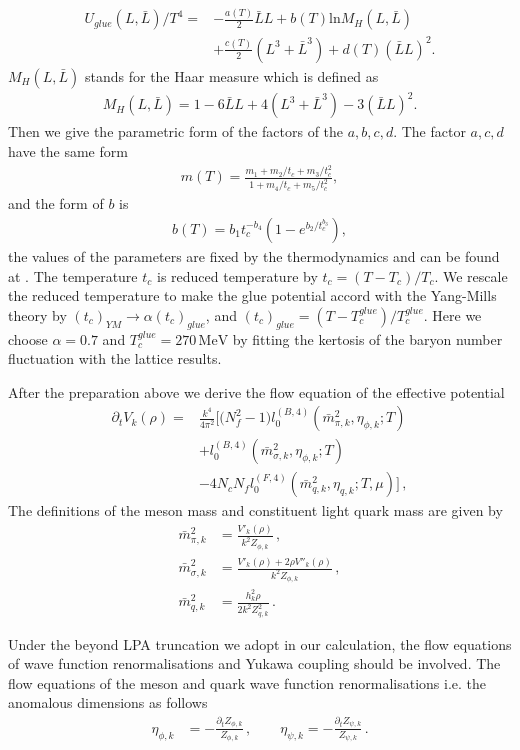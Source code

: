 \documentclass[%
reprint,
superscriptaddress,
showpacs,preprintnumbers,
 amsmath,amssymb,
 aps,
prd,
]{revtex4-1}
\begin{document}
\begin{align}
U_{glue}(L,\bar{L})/T^4=&-\frac{a(T)}{2}\bar{L}L+b(T)\mathrm{ln}M_H(L,\bar{L})\nonumber \\ 
&+\frac{c(T)}{2}(L^3+\bar{L}^3)+d(T)(\bar{L}L)^2.
\end{align}
$M_H(L,\bar{L})$ stands for the Haar measure which is defined as
\begin{align}
M_H(L,\bar{L})=1-6\bar{L}L+4(L^3+\bar{L}^3)-3(\bar{L}L)^2.
\end{align}
Then we give the parametric form of the factors of the $a,b,c,d$. The factor $a,c,d$ have the same form
\begin{align}
m(T)=\frac{m_1+m_2/t_c+m_3/t_c^2}{1+m_4/t_c+m_5/t_c^2},
\end{align}
and the form of $b$ is
\begin{align}
b(T)=b_1 t_c^{-b_4}(1-e^{b_2/t_c^{b_3}}),
\end{align}
the values of the parameters are fixed by the thermodynamics and can be found at \cite{Lo:2013hla}. The temperature $t_c$ is reduced temperature by $t_c=(T-T_c)/T_c$. We rescale the reduced temperature to make the glue potential accord with the Yang-Mills theory by $(t_c)_{YM}\rightarrow \alpha(t_c)_{glue}$, and $(t_c)_{glue}=(T-T^{glue}_c)/T^{glue}_c$. Here we choose $\alpha=0.7$ and $T^{glue}_c=270\,\mathrm{MeV}$ by fitting the kertosis of the baryon number fluctuation with the lattice results.\par
After the preparation above we derive the flow equation of the effective potential
\begin{align}
  \partial_t V_k(\rho)=&\frac{k^4}{4\pi^2} \bigg [\big(N^2_f-1\big) l^{(B,4)}_{0}(\bar{m}^{2}_{\pi,k},\eta_{\phi,k};T)\nonumber\\[2ex]
&+l^{(B,4)}_{0}(\bar{m}^{2}_{\sigma,k},\eta_{\phi,k};T)\nonumber\\[2ex]
&-4N_c N_f l^{(F,4)}_{0}(\bar{m}^{2}_{q,k},\eta_{q,k};T,\mu)\bigg]\,, \label{eq:flowV}
\end{align}
The definitions of the meson mass and constituent light quark mass are given by
\begin{align}
  \bar{m}^{2}_{\pi,k}&=\frac{V'_k(\rho)}{k^2Z_{\phi,k}}\,,\\[2ex]
  \bar{m}^{2}_{\sigma,k}&=\frac{V'_k(\rho)+2\rho V''_k(\rho)}{k^2 Z_{\phi,k}}\,,\\[2ex]
  \bar{m}^{2}_{q,k}&=\frac{h^{2}_{k}\rho}{2k^2Z^{2}_{q,k}}\,.
\end{align}\par
Under the beyond LPA truncation we adopt in our calculation, the flow equations of wave function renormalisations and Yukawa coupling should be involved. The flow equations of the meson and quark wave function renormalisations i.e. the anomalous dimensions as follows
\begin{align}
  \eta_{\phi,k}&=-\frac{\partial_t Z_{\phi,k}}{Z_{\phi,k}}\,,\qquad
  \eta_{\psi,k}=-\frac{\partial_t Z_{\psi,k}}{Z_{\psi,k}}\,.
\end{align}
\end{document}
